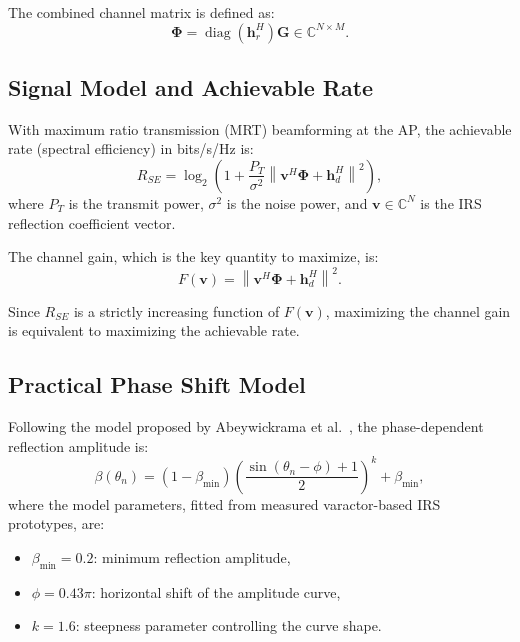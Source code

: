 \documentclass[12pt,a4paper]{article}
\newcommand{\vect}[1]{\boldsymbol{#1}}
\newcommand{\mat}[1]{\mathbf{#1}}
\newcommand{\norm}[1]{\left\|#1\right\|}
\DeclareMathOperator{\diag}{diag}
\begin{document}
The combined channel matrix is defined as:
\begin{equation}
    \mat{\Phi} = \diag(\mat{h}_r^H) \mat{G} \in \mathbb{C}^{N \times M}.
    \label{eq:combined_channel}
\end{equation}

\subsection{Signal Model and Achievable Rate}

With maximum ratio transmission (MRT) beamforming at the AP, the achievable rate (spectral efficiency) in bits/s/Hz is:
\begin{equation}
    R_{SE} = \log_2\left(1 + \frac{P_T}{\sigma^2} \norm{\vect{v}^H \mat{\Phi} + \mat{h}_d^H}^2\right),
    \label{eq:achievable_rate}
\end{equation}
where $P_T$ is the transmit power, $\sigma^2$ is the noise power, and $\vect{v} \in \mathbb{C}^N$ is the IRS reflection coefficient vector.

The channel gain, which is the key quantity to maximize, is:
\begin{equation}
    F(\vect{v}) = \norm{\vect{v}^H \mat{\Phi} + \mat{h}_d^H}^2.
    \label{eq:channel_gain}
\end{equation}

Since $R_{SE}$ is a strictly increasing function of $F(\vect{v})$, maximizing the channel gain is equivalent to maximizing the achievable rate.

\subsection{Practical Phase Shift Model}
\label{sec:practical_model}

Following the model proposed by Abeywickrama et al.\ \cite{abeywickrama2020intelligent}, the phase-dependent reflection amplitude is:
\begin{equation}
    \beta(\theta_n) = (1 - \beta_{\min}) \left(\frac{\sin(\theta_n - \phi) + 1}{2}\right)^k + \beta_{\min},
    \label{eq:beta_model}
\end{equation}
where the model parameters, fitted from measured varactor-based IRS prototypes, are:
\begin{itemize}
    \item $\beta_{\min} = 0.2$: minimum reflection amplitude,
    \item $\phi = 0.43\pi$: horizontal shift of the amplitude curve,
    \item $k = 1.6$: steepness parameter controlling the curve shape.
\end{itemize}
\end{document}
